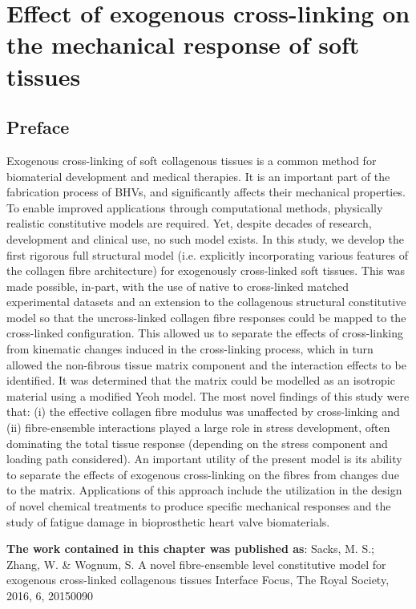 \chapter{Effect of exogenous cross-linking on the mechanical response of soft tissues}


\section*{Preface}
%

    Exogenous cross-linking of soft collagenous tissues is a common method for biomaterial development and medical therapies. It is an important part of the fabrication process of BHVs, and significantly affects their mechanical properties. To enable improved applications through computational methods, physically realistic constitutive models are required. Yet, despite decades of research, development and clinical use, no such model exists. In this study, we develop the first rigorous full structural model (i.e. explicitly incorporating various features of the collagen fibre architecture) for exogenously cross-linked soft tissues. This was made possible, in-part, with the use of native to cross-linked matched experimental datasets and an extension to the collagenous structural constitutive model so that the uncross-linked collagen fibre responses could be mapped to the cross-linked configuration. This allowed us to separate the effects of cross-linking from kinematic changes induced in the cross-linking process, which in turn allowed the non-fibrous tissue matrix component and the interaction effects to be identified. It was determined that the matrix could be modelled as an isotropic material using a modified Yeoh model. The most novel findings of this study were that: (i) the effective collagen fibre modulus was unaffected by cross-linking and (ii) fibre-ensemble interactions played a large role in stress development, often dominating the total tissue response (depending on the stress component and loading path considered). An important utility of the present model is its ability to separate the effects of exogenous cross-linking on the fibres from changes due to the matrix. Applications of this approach include the utilization in the design of novel chemical treatments to produce specific mechanical responses and the study of fatigue damage in bioprosthetic heart valve biomaterials.

\textbf{The work contained in this chapter was published as}:  Sacks, M. S.; Zhang, W. \& Wognum, S.
A novel fibre-ensemble level constitutive model for exogenous cross-linked collagenous tissues 
Interface Focus, The Royal Society, 2016, 6, 20150090 


